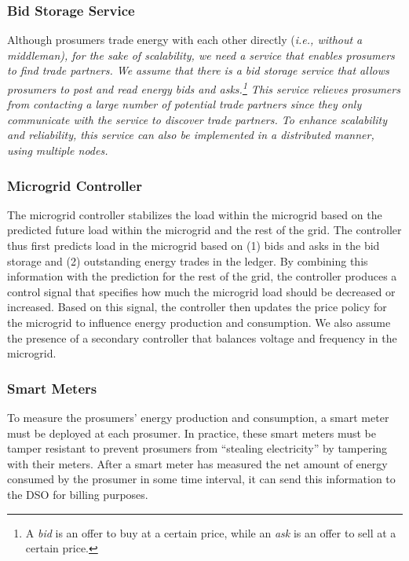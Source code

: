 \subsubsection{Bid Storage Service}
Although prosumers trade energy with each other directly (\em{i.e.},
without a middleman), for the sake of scalability, we need a service
that enables prosumers to find trade partners.
We assume that there is a bid storage service that allows prosumers to
post and read energy \emph{bids} and \emph{asks}.\footnote{A
  \emph{bid} is an offer to buy at a certain price, while an
  \emph{ask} is an offer to sell at a certain price.}  This service
relieves prosumers from contacting a large number of potential trade
partners since they only communicate with the service to discover
trade partners.
To enhance scalability and reliability, this service can also be
implemented in a distributed manner, using multiple nodes.

\subsubsection{Microgrid Controller}
The microgrid controller stabilizes the load within the microgrid
based on the predicted future load within the microgrid and the rest
of the grid.  The controller thus first predicts load in the microgrid
based on (1) bids and asks in the bid storage and (2) outstanding
energy trades in the ledger.  By combining this information with the
prediction for the rest of the grid, the controller produces a control
signal that specifies how much the microgrid load should be decreased
or increased.  Based on this signal, the controller then updates the
price policy for the microgrid to influence energy production and
consumption.  We also assume the presence of a secondary controller
that balances voltage and frequency in the microgrid.

\subsubsection{Smart Meters}
To measure the prosumers' energy production and consumption, a smart
meter must be deployed at each prosumer.  In practice, these smart
meters must be tamper resistant to prevent prosumers from ``stealing
electricity'' by tampering with their meters.  After a smart meter has
measured the net amount of energy consumed by the prosumer in some
time interval, it can send this information to the DSO for billing
purposes.

